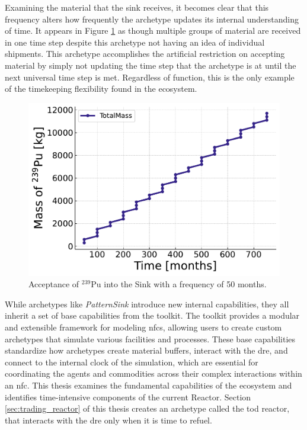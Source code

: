 Examining the material that the sink receives, it becomes clear that this
frequency alters how frequently the archetype updates its internal
understanding of time. It appears in Figure \ref{fig:pattern_freq_50} as though
multiple groups of material are received in one time step despite this
archetype not having an idea of individual shipments. This archetype
accomplishes the artificial restriction on accepting material by simply not
updating the time step that the archetype is at until the next universal time
step is met. Regardless of function, this is the only example of the
timekeeping flexibility found in the ecosystem.

\begin{figure}[H]
    \centering
    \includegraphics[scale=0.7]{images/cyclus/pattern_sink_fuel_transactions.pdf}
    \caption{Acceptance of $^{239}$Pu into the Sink with a frequency of 50 months.}
    \label{fig:pattern_freq_50}
\end{figure}

While archetypes like \textit{PatternSink} introduce new internal capabilities, they all inherit a set of base capabilities from the \cyclus toolkit. The \cyclus toolkit provides a modular and extensible framework for modeling \glspl{nfc}, allowing users to create custom archetypes that simulate various facilities and processes. These base capabilities standardize how archetypes create material buffers, interact with the \gls{dre}, and connect to the internal clock of the simulation, which are essential for coordinating the agents and commodities across their complex interactions within an \gls{nfc}. This thesis examines the fundamental capabilities of the \cyclus ecosystem and identifies time-intensive components of the current \cycamore Reactor. Section \ref{sec:trading_reactor} of this thesis creates an archetype called the \gls{tod} reactor, that interacts with the \gls{dre} only when it is time to refuel.


